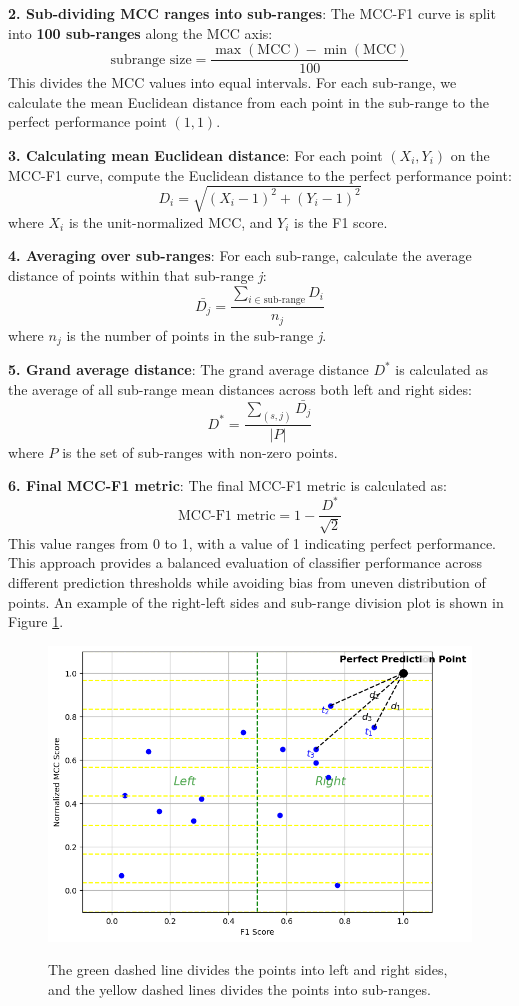 \documentclass[12pt, oneside]{amsart}
\theoremstyle{definition}
\theoremstyle{remark}
\numberwithin{equation}{section}
\begin{document}
\textbf{2. Sub-dividing MCC ranges into sub-ranges}:
   The MCC-F1 curve is split into \textbf{100 sub-ranges} along the MCC axis:
   \[
   \text{subrange size} = \frac{\max(\text{MCC}) - \min(\text{MCC})}{100}
   \]
   This divides the MCC values into equal intervals. For each sub-range, we calculate the mean Euclidean distance from each point in the sub-range to the perfect performance point \((1, 1)\).

\textbf{3. Calculating mean Euclidean distance}:
   For each point \((X_i, Y_i)\) on the MCC-F1 curve, compute the Euclidean distance to the perfect performance point:
   \[
   D_i = \sqrt{(X_i - 1)^2 + (Y_i - 1)^2}
   \]
   where \( X_i \) is the unit-normalized MCC, and \( Y_i \) is the F1 score.

\textbf{4. Averaging over sub-ranges}:
   For each sub-range, calculate the average distance of points within that sub-range \textit{j}:
   \[
   \bar{D_j} = \frac{\sum_{i \in \text{sub-range}} D_i}{n_j}
   \]
   where \( n_j \) is the number of points in the sub-range \textit{j}.

\textbf{5. Grand average distance}:
   The grand average distance \( D^* \) is calculated as the average of all sub-range mean distances across both left and right sides:
   \[
   D^* = \frac{\sum_{(s, j)} \bar{D_j}}{|P|}
   \]
   where \( P \) is the set of sub-ranges with non-zero points.

\textbf{6. Final MCC-F1 metric}:
   The final MCC-F1 metric is calculated as:
   \[
   \text{MCC-F1 metric} = 1 - \frac{D^*}{\sqrt{2}}
   \]
   This value ranges from 0 to 1, with a value of 1 indicating perfect performance.
\\

This approach provides a balanced evaluation of classifier performance across different prediction thresholds while avoiding bias from uneven distribution of points. An example of the right-left sides and sub-range division plot is shown in Figure \ref{figure2}. 
\begin{figure}[hbt!]
    \centering
    \includegraphics[scale=0.3]{Report/Figure/figure2.jpg}
    \label{figure2}
    \caption{The green dashed line divides the points into left and right sides, and the yellow dashed lines divides the points into sub-ranges. }
\end{figure}
\FloatBarrier
\end{document}
